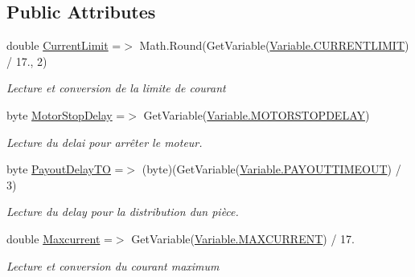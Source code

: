\subsection*{Public Attributes}
\begin{DoxyCompactItemize}
\item 
double \mbox{\hyperlink{class_device_library_1_1_c_hopper_variable_set_a878c99ad40cf59721df6cbb6eca89c4a}{Current\+Limit}} =$>$ Math.\+Round(Get\+Variable(\mbox{\hyperlink{class_device_library_1_1_c_hopper_variable_set_a3b79d051f89692abb5d34ae3f4e946bea4813867da2e7cbfd225e950893f2063b}{Variable.\+C\+U\+R\+R\+E\+N\+T\+L\+I\+M\+IT}}) / 17., 2)
\begin{DoxyCompactList}\small\item\em Lecture et conversion de la limite de courant \end{DoxyCompactList}\item 
byte \mbox{\hyperlink{class_device_library_1_1_c_hopper_variable_set_a2543100f16a6382ce5e3a8836d5dcd6e}{Motor\+Stop\+Delay}} =$>$ Get\+Variable(\mbox{\hyperlink{class_device_library_1_1_c_hopper_variable_set_a3b79d051f89692abb5d34ae3f4e946bea07f83719bd6b4fbe57de5df0adcd6040}{Variable.\+M\+O\+T\+O\+R\+S\+T\+O\+P\+D\+E\+L\+AY}})
\begin{DoxyCompactList}\small\item\em Lecture du delai pour arrêter le moteur. \end{DoxyCompactList}\item 
byte \mbox{\hyperlink{class_device_library_1_1_c_hopper_variable_set_a45d7b128b6601b10c94103e94413da7e}{Payout\+Delay\+TO}} =$>$ (byte)(Get\+Variable(\mbox{\hyperlink{class_device_library_1_1_c_hopper_variable_set_a3b79d051f89692abb5d34ae3f4e946bea2ce47c5981a3b2d40b2dea2bcc857dfe}{Variable.\+P\+A\+Y\+O\+U\+T\+T\+I\+M\+E\+O\+UT}}) / 3)
\begin{DoxyCompactList}\small\item\em Lecture du delay pour la distribution d\textquotesingle{}un pièce. \end{DoxyCompactList}\item 
double \mbox{\hyperlink{class_device_library_1_1_c_hopper_variable_set_a028cfdeb39a1890d2d91f55717c28811}{Maxcurrent}} =$>$ Get\+Variable(\mbox{\hyperlink{class_device_library_1_1_c_hopper_variable_set_a3b79d051f89692abb5d34ae3f4e946bea07eaaced542a660738d0b539a58d1b51}{Variable.\+M\+A\+X\+C\+U\+R\+R\+E\+NT}}) / 17.
\begin{DoxyCompactList}\small\item\em Lecture et conversion du courant maximum \end{DoxyCompactList}\item 

\end{DoxyCompactItemize}
